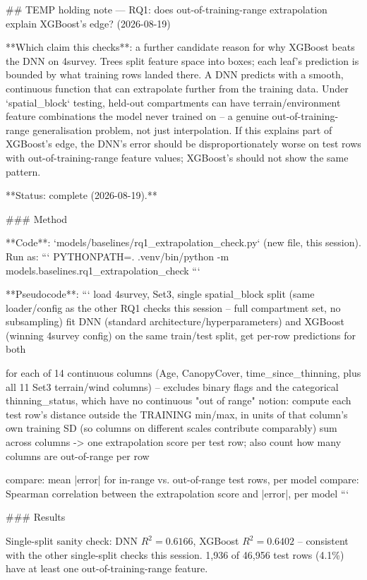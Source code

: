 ## TEMP holding note — RQ1: does out-of-training-range extrapolation explain XGBoost's edge? (2026-08-19)

**Which claim this checks**: a further candidate reason for why XGBoost beats the DNN on
4survey. Trees split feature space into boxes; each leaf's prediction is bounded by what training
rows landed there. A DNN predicts with a smooth, continuous function that can extrapolate further
from the training data. Under `spatial_block` testing, held-out compartments can have
terrain/environment feature combinations the model never trained on -- a genuine
out-of-training-range generalisation problem, not just interpolation. If this explains part of
XGBoost's edge, the DNN's error should be disproportionately worse on test rows with
out-of-training-range feature values; XGBoost's should not show the same pattern.

**Status: complete (2026-08-19).**

### Method

**Code**: `models/baselines/rq1_extrapolation_check.py` (new file, this session). Run as:
```
PYTHONPATH=. .venv/bin/python -m models.baselines.rq1_extrapolation_check
```

**Pseudocode**:
```
load 4survey, Set3, single spatial_block split (same loader/config as the other RQ1 checks this
    session -- full compartment set, no subsampling)
fit DNN (standard architecture/hyperparameters) and XGBoost (winning 4survey config) on the same
    train/test split, get per-row predictions for both

for each of 14 continuous columns (Age, CanopyCover, time_since_thinning, plus all 11 Set3
    terrain/wind columns) -- excludes binary flags and the categorical thinning_status, which
    have no continuous "out of range" notion:
    compute each test row's distance outside the TRAINING min/max, in units of that column's own
        training SD (so columns on different scales contribute comparably)
sum across columns -> one extrapolation score per test row; also count how many columns are
    out-of-range per row

compare: mean |error| for in-range vs. out-of-range test rows, per model
compare: Spearman correlation between the extrapolation score and |error|, per model
```

### Results

Single-split sanity check: DNN $R^2=0.6166$, XGBoost $R^2=0.6402$ -- consistent with the other
single-split checks this session. 1,936 of 46,956 test rows (4.1\%) have at least one
out-of-training-range feature.

